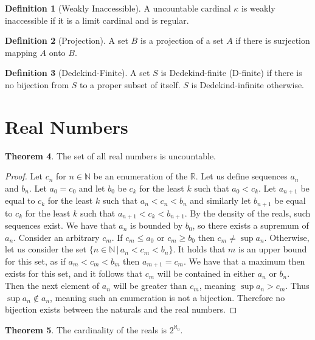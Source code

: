 \documentclass{article}
\theoremstyle{definition}
\newtheorem{thm}{Theorem}[section]
\newtheorem{defn}[thm]{Definition}
\newcommand{\N}{\mathbb{N}}
\newcommand{\R}{\mathbb{R}}
\begin{document}
\begin{defn}[Weakly Inaccessible]
    A uncountable cardinal $\kappa$ is weakly inaccessible if it is a limit cardinal and is regular. 
\end{defn}

\begin{defn}[Projection]
    A set $B$ is a projection of a set $A$ if there is surjection mapping $A$ onto $B$. 
\end{defn}

\begin{defn}[Dedekind-Finite]
    A set $S$ is Dedekind-finite (D-finite) if there is no bijection from $S$ to a proper subset of itself. $S$ is Dedekind-infinite otherwise.
\end{defn}

\section{Real Numbers }

\begin{thm}
    The set of all real numbers is uncountable.
\end{thm}

\begin{proof}
    Let $c_n$ for $n \in \N$ be an enumeration of the $\R$. Let us define sequences $a_n$ and $b_n$. Let $a_0 = c_0$ and let $b_0$ be $c_k$ for the least $k$ such that $a_0 < c_k$. Let $a_{n + 1}$ be equal to $c_k$ for the least $k$ such that $a_n < c_n < b_n$ and similarly let $b_{n + 1}$ be equal to $c_k$ for the least $k$ such that $a_{n + 1} < c_k < b_{n + 1}$. By the density of the reals, such sequences exist. We have that $a_n$ is bounded by $b_0$, so there exists a supremum of $a_n$. Consider an arbitrary $c_m$. If $c_m \le a_0$ or $c_m \ge b_0$ then $c_m \ne \sup a_n$. Otherwise, let us consider the set $\{n \in \N \, | \, a_n < c_m < b_n\}$. It holds that $m$ is an upper bound for this set, as if $a_m < c_m < b_m$ then $a_{m + 1} = c_m$. We have that a maximum then exists for this set, and it follows that $c_m$ will be contained in either $a_n$ or $b_n$. Then the next element of $a_n$ will be greater than $c_m$, meaning $\sup a_n > c_m$. Thus $\sup a_n \not\in a_n$, meaning such an enumeration is not a bijection. Therefore no bijection exists between the naturals and the real numbers.
\end{proof}

\begin{thm}
    The cardinality of the reals is $2^{\aleph_0}$.
\end{thm}
\end{document}
